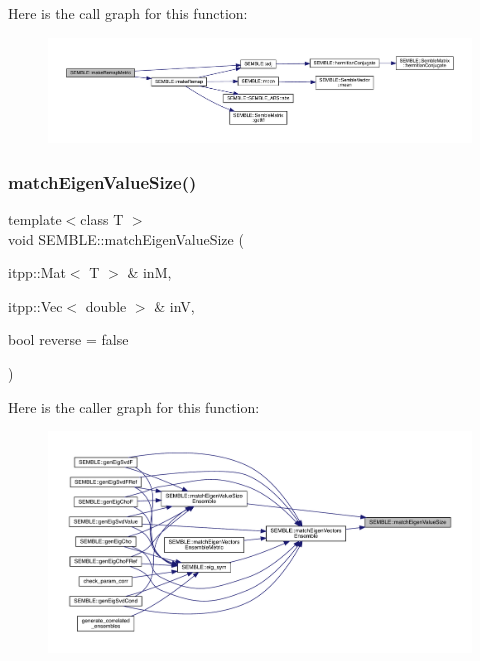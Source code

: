 Here is the call graph for this function\+:
\nopagebreak
\begin{figure}[H]
\begin{center}
\leavevmode
\includegraphics[width=350pt]{d7/dfd/namespaceSEMBLE_a487d1e90c43dcb23f1d3eecb8f98376c_cgraph}
\end{center}
\end{figure}
\mbox{\label{namespaceSEMBLE_ab4aa2c99272f76a558c7f98e0c27daba}} 
\subsubsection{\texorpdfstring{matchEigenValueSize()}{matchEigenValueSize()}}
{\footnotesize\ttfamily template$<$class T $>$ \\
void S\+E\+M\+B\+L\+E\+::match\+Eigen\+Value\+Size (\begin{DoxyParamCaption}\item[{itpp\+::\+Mat$<$ T $>$ \&}]{inM,  }\item[{itpp\+::\+Vec$<$ double $>$ \&}]{inV,  }\item[{bool}]{reverse = {\ttfamily false} }\end{DoxyParamCaption})}

Here is the caller graph for this function\+:
\nopagebreak
\begin{figure}[H]
\begin{center}
\leavevmode
\includegraphics[width=350pt]{d7/dfd/namespaceSEMBLE_ab4aa2c99272f76a558c7f98e0c27daba_icgraph}
\end{center}
\end{figure}
\mbox{\label{namespaceSEMBLE_ad811e95bd734c5aefb5b45cd80f49f87}} 
